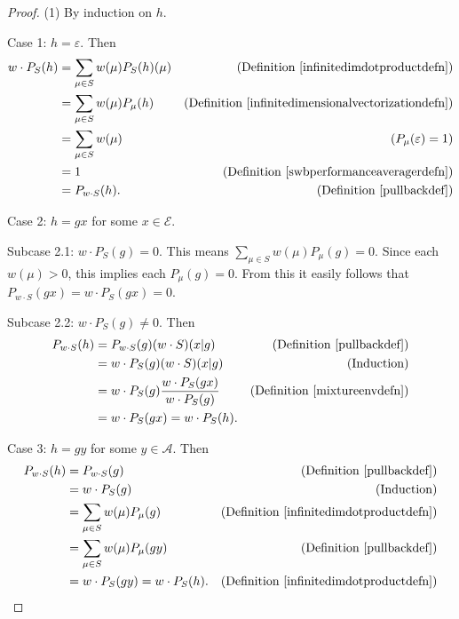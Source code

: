 \documentclass[twoside]{article}
\begin{document}
\begin{proof}
    (1) By induction on $h$.

    Case 1: $h=\varepsilon$. Then
    \begin{align*}
        w\cdot P_{S}(h)
        &= \sum_{\mu\in S}w(\mu)P_{S}(h)(\mu)
            &\mbox{(Definition \ref{infinitedimdotproductdefn})}\\
        &= \sum_{\mu\in S}w(\mu)P_\mu(h)
            &\mbox{(Definition \ref{infinitedimensionalvectorizationdefn})}\\
        &= \sum_{\mu\in S}w(\mu)
            &\mbox{($P_\mu(\varepsilon)=1$)}\\
        &= 1
            &\mbox{(Definition \ref{swbperformanceaveragerdefn})}\\
        &= P_{w\cdot S}(h).
            &\mbox{(Definition \ref{pullbackdef})}
    \end{align*}

    Case 2: $h=gx$ for some $x\in\mathcal E$.

    Subcase 2.1: $w\cdot P_{S}(g)=0$.
        This means $\sum_{\mu\in S}w(\mu)P_\mu(g)=0$.
        Since each $w(\mu)>0$, this implies each $P_\mu(g)=0$.
        From this it easily follows that
        $P_{w\cdot S}(gx)=w\cdot P_{S}(gx)=0$.

    Subcase 2.2: $w\cdot P_{S}(g)\not=0$. Then
    \begin{align*}
        P_{w\cdot S}(h)
            &= P_{w\cdot S}(g)(w\cdot S)(x|g)
                &\mbox{(Definition \ref{pullbackdef})}\\
            &= w\cdot P_{S}(g)(w\cdot S)(x|g)
                &\mbox{(Induction)}\\
            &= w\cdot P_{S}(g)\frac{w\cdot P_{S}(gx)}{w\cdot P_{S}(g)}
                &\mbox{(Definition \ref{mixtureenvdefn})}\\
            &= w\cdot P_{S}(gx) = w\cdot P_{S}(h).
    \end{align*}

    Case 3: $h=gy$ for some $y\in\mathcal A$.
    Then
    \begin{align*}
        P_{w\cdot S}(h)
            &= P_{w\cdot S}(g)
                &\mbox{(Definition \ref{pullbackdef})}\\
            &= w\cdot P_{S}(g)
                &\mbox{(Induction)}\\
            &= \sum_{\mu\in S} w(\mu)P_\mu(g)
                &\mbox{(Definition \ref{infinitedimdotproductdefn})}\\
            &= \sum_{\mu\in S} w(\mu)P_\mu(gy)
                &\mbox{(Definition \ref{pullbackdef})}\\
            &= w\cdot P_{S}(gy) = w\cdot P_{S}(h).
                &\mbox{(Definition \ref{infinitedimdotproductdefn})}
    \end{align*}


\end{proof}
\end{document}
